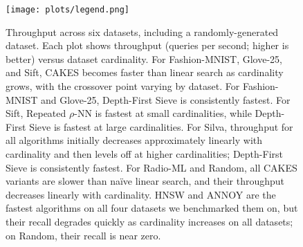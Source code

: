 \begin{figure}[h]
  \vskip -0.2in
  \centering

  \vskip -0.1in

  \vskip -0.1in

  \vskip 0.05in
  \texttt{[image: plots/legend.png]}

  \caption{Throughput across six datasets, including a randomly-generated dataset.
  Each plot shows throughput (queries per second; higher is better) versus dataset cardinality. For Fashion-MNIST, Glove-25, and Sift, CAKES becomes faster than linear search as cardinality grows, with the crossover point varying by dataset. For Fashion-MNIST and Glove-25, Depth-First Sieve is consistently fastest. For Sift, Repeated $\rho$-NN is fastest at small cardinalities, while Depth-First Sieve is fastest at large cardinalities. For Silva, throughput for all algorithms initially decreases approximately linearly with cardinality and then levels off at higher cardinalities; Depth-First Sieve is consistently fastest. For Radio-ML and Random, all CAKES variants are slower than na\"{i}ve linear search, and their throughput decreases linearly with cardinality. HNSW and ANNOY are the fastest algorithms on all four datasets we benchmarked them on, but their recall degrades quickly as cardinality increases on all datasets; on Random, their recall is near zero.}
  \label{fig:results:scaling-plots}
\end{figure}

